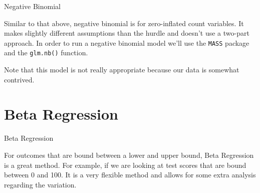 \begin{frame}[fragile]{Negative Binomial}

Similar to that above, negative binomial is for zero-inflated count
variables. It makes slightly different assumptions than the hurdle and
doesn't use a two-part approach. In order to run a negative binomial
model we'll use the \texttt{MASS} package and the \texttt{glm.nb()}
function.

\small

\begin{Shaded}
\begin{Highlighting}[]
\StringTok{ }\OperatorTok{~}\StringTok{ }\OperatorTok{+}\StringTok{ }\OperatorTok{+}\StringTok{ }
\end{Highlighting}
\end{Shaded}

\normalsize

Note that this model is not really appropriate because our data is
somewhat contrived.

\end{frame}

\section{Beta Regression}\label{beta-regression}

\begin{frame}{Beta Regression}

For outcomes that are bound between a lower and upper bound, Beta
Regression is a great method. For example, if we are looking at test
scores that are bound between 0 and 100. It is a very flexible method
and allows for some extra analysis regarding the variation.

\end{frame}

